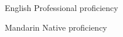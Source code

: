 
\begin{cvskills}

  \cvskill
    {English} %
    {Professional proficiency} %

  \cvskill
    {Mandarin} %
    {Native proficiency} %
    
\end{cvskills}

